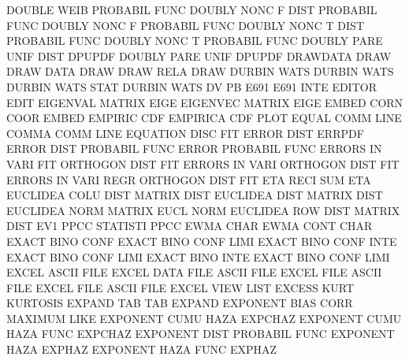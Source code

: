 DOUBLE   WEIB                           PROBABIL FUNC
DOUBLY   NONC F    DIST                 PROBABIL FUNC
DOUBLY   NONC F                         PROBABIL FUNC
DOUBLY   NONC T    DIST                 PROBABIL FUNC
DOUBLY   NONC T                         PROBABIL FUNC
DOUBLY   PARE UNIF DIST                 DPUPDF
DOUBLY   PARE UNIF                      DPUPDF
DRAWDATA                                DRAW
DRAW     DATA                           DRAW
DRAW     RELA                           DRAW
DURBIN   WATS                           DURBIN   WATS
DURBIN   WATS STAT                      DURBIN   WATS
DV                                      PB
E691                                    E691     INTE
EDITOR                                  EDIT
EIGENVAL                                MATRIX   EIGE
EIGENVEC                                MATRIX   EIGE
EMBED    CORN COOR                      EMBED
EMPIRIC  CDF                            EMPIRICA CDF  PLOT
EQUAL    COMM LINE                      COMMA    COMM LINE
EQUATION DISC                           FIT
ERROR    DIST                           ERRPDF
ERROR    DIST                           PROBABIL FUNC
ERROR                                   PROBABIL FUNC
ERRORS   IN   VARI FIT                  ORTHOGON DIST FIT
ERRORS   IN   VARI                      ORTHOGON DIST FIT
ERRORS   IN   VARI REGR                 ORTHOGON DIST FIT
ETA      RECI SUM                       ETA
EUCLIDEA COLU DIST                      MATRIX   DIST
EUCLIDEA DIST                           MATRIX   DIST
EUCLIDEA NORM                           MATRIX   EUCL NORM
EUCLIDEA ROW  DIST                      MATRIX   DIST
EV1      PPCC                           STATISTI PPCC
EWMA     CHAR                           EWMA     CONT CHAR
EXACT    BINO CONF                      EXACT    BINO CONF LIMI
EXACT    BINO CONF INTE                 EXACT    BINO CONF LIMI
EXACT    BINO INTE                      EXACT    BINO CONF LIMI
EXCEL                                   ASCII    FILE
EXCEL    DATA FILE                      ASCII    FILE
EXCEL    FILE                           ASCII    FILE
EXCEL    FILE                           ASCII    FILE
EXCEL    VIEW                           LIST
EXCESS   KURT                           KURTOSIS
EXPAND   TAB                            TAB      EXPAND
EXPONENT BIAS CORR                      MAXIMUM  LIKE
EXPONENT CUMU HAZA                      EXPCHAZ
EXPONENT CUMU HAZA FUNC                 EXPCHAZ
EXPONENT DIST                           PROBABIL FUNC
EXPONENT HAZA                           EXPHAZ
EXPONENT HAZA FUNC                      EXPHAZ
